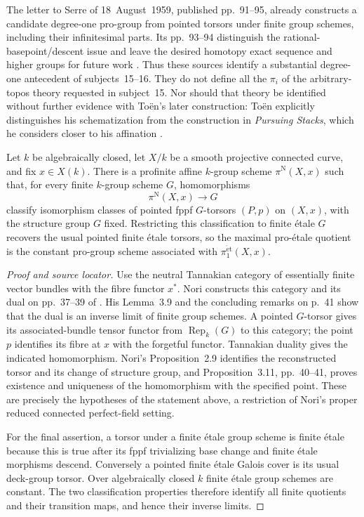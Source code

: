 The letter to Serre of 18~August~1959, published pp.~91--95, already
constructs a candidate degree-one pro-group from pointed torsors under
finite group schemes, including their infinitesimal parts.  Its
pp.~93--94 distinguish the rational-basepoint/descent issue and leave
the desired homotopy exact sequence and higher groups for future work
\cite{A567_GrothendieckSerre2004}.  Thus these sources identify a
substantial degree-one antecedent of subjects~15--16.  They do not
define all the $\pi_i$ of the arbitrary-topos theory requested in
subject~15.  Nor should that theory be identified without further
evidence with To\"en's later construction: To\"en explicitly distinguishes
his schematization from the construction in \emph{Pursuing Stacks},
which he considers closer to his affination
\cite[p.~11 and Appendix~A]{BToen2006}.

\begin{theorem}\label{B:nori-finite-flat}
Let $k$ be algebraically closed, let $X/k$ be a smooth projective
connected curve, and fix $x\in X(k)$.  There is a profinite affine
$k$-group scheme $\pi^{\mathrm N}(X,x)$ such that, for every finite
$k$-group scheme $G$, homomorphisms
\[
  \pi^{\mathrm N}(X,x)\longrightarrow G
\]
classify isomorphism classes of pointed fppf $G$-torsors $(P,p)$ on
$(X,x)$, with the structure group $G$ fixed.  Restricting this
classification to finite \'etale $G$ recovers the usual pointed finite
\'etale torsors, so the maximal pro-\'etale quotient is the constant
pro-group scheme associated with $\pi_1^{\mathrm{\acute et}}(X,x)$.
\end{theorem}
\begin{proof}[Proof and source locator]
Use the neutral Tannakian category of essentially finite vector
bundles with the fibre functor $x^*$.  Nori constructs this category
and its dual on pp.~37--39 of \cite{A567_Nori1976}.
His Lemma~3.9 and the concluding remarks on p.~41 show that the
dual is an inverse limit of finite group schemes.  A pointed
$G$-torsor gives its associated-bundle tensor functor from
$\operatorname{Rep}_k(G)$ to this category; the point $p$ identifies
its fibre at $x$ with the forgetful functor.  Tannakian duality gives
the indicated homomorphism.  Nori's Proposition~2.9 identifies the
reconstructed torsor and its change of structure group, and
Proposition~3.11, pp.~40--41, proves existence and uniqueness of
the homomorphism with the specified point.  These are precisely
the hypotheses of the statement above, a restriction of Nori's
proper reduced connected perfect-field setting.

For the final assertion, a torsor under a finite \'etale group scheme
is finite \'etale because this is true after its fppf trivializing
base change and finite \'etale morphisms descend.  Conversely a
pointed finite \'etale Galois cover is its usual deck-group torsor.
Over algebraically closed $k$ finite \'etale group schemes are
constant.  The two classification properties therefore identify
all finite quotients and their transition maps, and hence their
inverse limits.
\end{proof}

